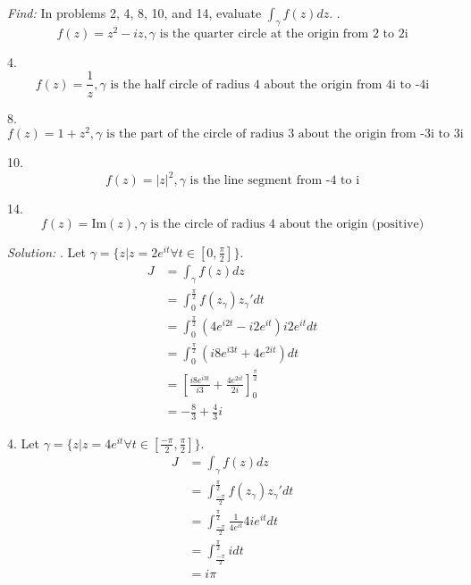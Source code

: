 \documentclass[11pt]{homework}
\begin{document}
\maketitle

\emph{Find:}
\newline
In problems 2, 4, 8, 10, and 14,
evaluate $\int_{\gamma} f(z) dz$.
.
\begin{equation*}
  f(z) = z^2 - iz, \gamma \text{ is the quarter circle at the origin from 2 to 2i}
\end{equation*}

4.
\begin{equation*}
  f(z) = \frac{1}{z}, \gamma \text{ is the half circle of radius 4 about the origin from 4i to -4i}
\end{equation*}

8.
\begin{equation*}
  f(z) = 1 + z^2, \gamma \text{ is the part of the circle of radius 3 about the origin from -3i to 3i}
\end{equation*}

10. 
\begin{equation*}
  f(z) = |z|^2, \gamma \text{ is the line segment from -4 to i}
\end{equation*}

14.
\begin{equation*}
  f(z) = \text{Im}(z), \gamma \text{ is the circle of radius 4 about the origin (positive)}
\end{equation*}

\emph{Solution:}
. Let $\gamma = \{z | z = 2 e^{it} \forall t\in[0,\frac{\pi}{2}]\}$.
\begin{align*}
  J &= \int_\gamma f(z) dz \\
    &= \int_0^{\frac{\pi}{2}} f(z_\gamma) z_\gamma' dt \\
    &= \int_0^{\frac{\pi}{2}} (4e^{i2t} - i2e^{it}) i2e^{it} dt \\
    &= \int_0^{\frac{\pi}{2}} (i8e^{i3t} + 4e^{2it}) dt\\
    &= \left[ \frac{i8e^{i3t}}{i3} + \frac{4e^{2it}}{2i} \right]_0^\frac{\pi}{2} \\
    &= -\frac{8}{3} +\frac{4}{3}i
\end{align*}

4. Let $\gamma = \{z | z = 4 e^{it} \forall t\in[\frac{-\pi}{2},\frac{\pi}{2}]\}$.
\begin{align*}
  J &= \int_\gamma f(z) dz \\
    &= \int_\frac{-\pi}{2}^{\frac{\pi}{2}} f(z_\gamma) z_\gamma' dt  \\
    &= \int_\frac{-\pi}{2}^{\frac{\pi}{2}} \frac{1}{4e^{it}} 4ie^{it} dt  \\
    &= \int_\frac{-\pi}{2}^{\frac{\pi}{2}} i dt \\
    &= i\pi
\end{align*}
\end{document}
